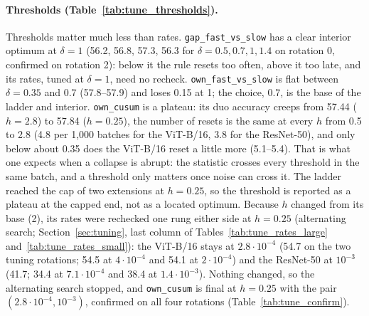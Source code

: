 \documentclass[10pt]{article}
\newcommand{\rl}[1]{\texttt{#1}}
\newcommand{\vit}{ViT-B/16}
\newcommand{\rn}{ResNet-50}
\begin{document}
\paragraph{Thresholds (Table~\ref{tab:tune_thresholds}).} Thresholds matter much less than rates. \rl{gap\_fast\_vs\_slow} has a clear interior optimum at $\delta = 1$ (56.2, 56.8, 57.3, 56.3 for $\delta = 0.5, 0.7, 1, 1.4$ on rotation 0, confirmed on rotation 2): below it the rule resets too often, above it too late, and its rates, tuned at $\delta = 1$, need no recheck. \rl{own\_fast\_vs\_slow} is flat between $\delta = 0.35$ and 0.7 (57.8--57.9) and loses 0.15 at 1; the choice, 0.7, is the base of the ladder and interior. \rl{own\_cusum} is a plateau: its duo accuracy creeps from 57.44 ($h = 2.8$) to 57.84 ($h = 0.25$), the number of resets is the same at every $h$ from 0.5 to 2.8 (4.8 per 1,000 batches for the \vit{}, 3.8 for the \rn{}), and only below about 0.35 does the \vit{} reset a little more (5.1--5.4). That is what one expects when a collapse is abrupt: the statistic crosses every threshold in the same batch, and a threshold only matters once noise can cross it. The ladder reached the cap of two extensions at $h = 0.25$, so the threshold is reported as a plateau at the capped end, not as a located optimum. Because $h$ changed from its base (2), its rates were rechecked one rung either side at $h = 0.25$ (alternating search; Section~\ref{sec:tuning}, last column of Tables~\ref{tab:tune_rates_large} and~\ref{tab:tune_rates_small}): the \vit{} stays at $2.8 \cdot 10^{-4}$ (54.7 on the two tuning rotations; 54.5 at $4 \cdot 10^{-4}$ and 54.1 at $2 \cdot 10^{-4}$) and the \rn{} at $10^{-3}$ (41.7; 34.4 at $7.1 \cdot 10^{-4}$ and 38.4 at $1.4 \cdot 10^{-3}$). Nothing changed, so the alternating search stopped, and \rl{own\_cusum} is final at $h = 0.25$ with the pair $(2.8 \cdot 10^{-4}, 10^{-3})$, confirmed on all four rotations (Table~\ref{tab:tune_confirm}).


\end{document}
